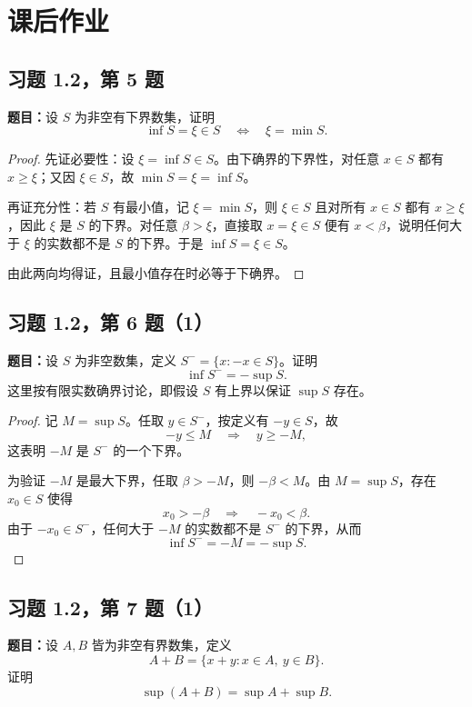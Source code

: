 \documentclass[UTF8, fontset=fandol, a4paper, 12pt]{ctexart}
\theoremstyle{definition}
\begin{document}
\newpage
\section{课后作业}

\subsection{习题 1.2，第 5 题}
\noindent\textbf{题目：}设 $S$ 为非空有下界数集，证明
\[
  \inf S=\xi\in S\quad\Longleftrightarrow\quad\xi=\min S.
\]

\begin{proof}
先证必要性：设 $\xi=\inf S\in S$。由下确界的下界性，对任意 $x\in S$ 都有 $x\ge\xi$；又因 $\xi\in S$，故 $\min S=\xi=\inf S$。

再证充分性：若 $S$ 有最小值，记 $\xi=\min S$，则 $\xi\in S$ 且对所有 $x\in S$ 都有 $x\ge\xi$，因此 $\xi$ 是 $S$ 的下界。对任意 $\beta>\xi$，直接取 $x=\xi\in S$ 便有 $x<\beta$，说明任何大于 $\xi$ 的实数都不是 $S$ 的下界。于是 $\inf S=\xi\in S$。

由此两向均得证，且最小值存在时必等于下确界。
\end{proof}

\subsection{习题 1.2，第 6 题（1）}
\noindent\textbf{题目：}设 $S$ 为非空数集，定义
$S^{-}=\{x:-x\in S\}$。证明
\[
  \inf S^{-}=-\sup S.
\]
\noindent 这里按有限实数确界讨论，即假设 $S$ 有上界以保证 $\sup S$ 存在。

\begin{proof}
记 $M=\sup S$。任取 $y\in S^{-}$，按定义有 $-y\in S$，故
\[
  -y\le M\quad\Longrightarrow\quad y\ge-M,
\]
这表明 $-M$ 是 $S^{-}$ 的一个下界。

为验证 $-M$ 是最大下界，任取 $\beta>-M$，则 $-\beta<M$。由 $M=\sup S$，存在 $x_0\in S$ 使得
\[
  x_0>-\beta\quad\Longrightarrow\quad -x_0<\beta.
\]
由于 $-x_0\in S^{-}$，任何大于 $-M$ 的实数都不是 $S^{-}$ 的下界，从而
\[
  \inf S^{-}=-M=-\sup S.
\]
\end{proof}

\subsection{习题 1.2，第 7 题（1）}
\noindent\textbf{题目：}设 $A,B$ 皆为非空有界数集，定义
\[
  A+B=\{x+y:x\in A,\ y\in B\}.
\]
证明
\[
  \sup(A+B)=\sup A+\sup B.
\]
\end{document}
